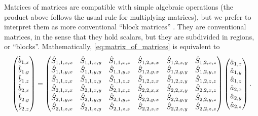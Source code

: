 Matrices of matrices are compatible with simple algebraic operations (the product above follows the usual rule for multiplying matrices), but we prefer to interpret them as more conventional ``block matrices'' \parencite{eves2012elementary}.
They are conventional matrices, in the sense that they hold scalars, but they are subdivided in regions, or ``blocks''.
Mathematically, \cref{eq:matrix_of_matrices} is equivalent to
\begin{equation}
    \begin{pmatrix}
        \hat{b}_{1, x} \\ \hat{b}_{1, y} \\ \hat{b}_{1, z}
        \\
        \hat{b}_{2, x} \\ \hat{b}_{2, y} \\ \hat{b}_{2, z}
    \end{pmatrix}
    =
    \begin{pmatrix}
        \hat{S}_{1, 1, x, x} & \hat{S}_{1, 1, x, y} & \hat{S}_{1, 1, x, z}   &   \hat{S}_{1, 2, x, x} & \hat{S}_{1, 2, x, y} & \hat{S}_{1, 2, x, z} \\
        \hat{S}_{1, 1, y, x} & \hat{S}_{1, 1, y, y} & \hat{S}_{1, 1, y, z}   &   \hat{S}_{1, 2, y, x} & \hat{S}_{1, 2, y, y} & \hat{S}_{1, 2, y, z} \\
        \hat{S}_{1, 1, z, x} & \hat{S}_{1, 1, z, y} & \hat{S}_{1, 1, z, z}   &   \hat{S}_{1, 2, z, x} & \hat{S}_{1, 2, z, y} & \hat{S}_{1, 2, z, z} \\
        \hat{S}_{2, 1, x, x} & \hat{S}_{2, 1, x, y} & \hat{S}_{2, 1, x, z}   &   \hat{S}_{2, 2, x, x} & \hat{S}_{2, 2, x, y} & \hat{S}_{2, 2, x, z} \\
        \hat{S}_{2, 1, y, x} & \hat{S}_{2, 1, y, y} & \hat{S}_{2, 1, y, z}   &   \hat{S}_{2, 2, y, x} & \hat{S}_{2, 2, y, y} & \hat{S}_{2, 2, y, z} \\
        \hat{S}_{2, 1, z, x} & \hat{S}_{2, 1, z, y} & \hat{S}_{2, 1, z, z}   &   \hat{S}_{2, 2, z, x} & \hat{S}_{2, 2, z, y} & \hat{S}_{2, 2, z, z}
    \end{pmatrix}
    \begin{pmatrix}
        \hat{a}_{1, x} \\ \hat{a}_{1, y} \\ \hat{a}_{1, z}
        \\
        \hat{a}_{2, x} \\ \hat{a}_{2, y} \\ \hat{a}_{2, z}
    \end{pmatrix}
    \text{.}
    \label{eq:matrix_flattenned}
\end{equation}
